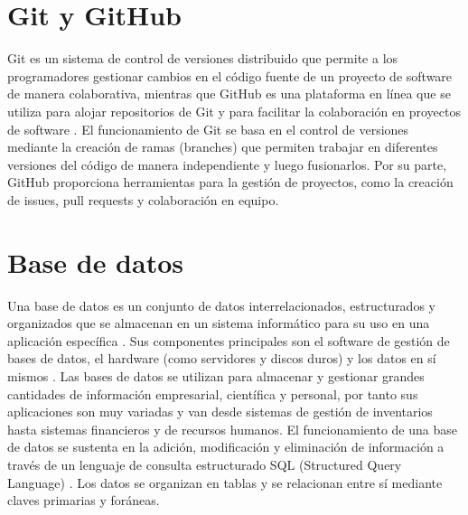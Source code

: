 \section{Git y GitHub}
Git es un sistema de control de versiones distribuido que permite a los programadores gestionar cambios en el código fuente de un proyecto de software de manera colaborativa, mientras que GitHub es una plataforma en línea que se utiliza para alojar repositorios de Git y para facilitar la colaboración en proyectos de software \cite{art:pro_git}.
El funcionamiento de Git se basa en el control de versiones mediante la creación de ramas (branches) que permiten trabajar en diferentes versiones del código de manera independiente y luego fusionarlos. Por su parte, GitHub proporciona herramientas para la gestión de proyectos, como la creación de issues, pull requests y colaboración en equipo.

\section{Base de datos}
Una base de datos es un conjunto de datos interrelacionados, estructurados y organizados que se almacenan en un sistema informático para su uso en una aplicación específica \cite{book:base_de_datos_connolly}. Sus componentes principales son el software de gestión de bases de datos, el hardware (como servidores y discos duros) y los datos en sí mismos \cite{book:base_de_datos_coronel}. 
Las bases de datos se utilizan para almacenar y gestionar grandes cantidades de información  empresarial, científica y personal, por tanto sus aplicaciones son muy variadas y van desde sistemas de gestión de inventarios hasta sistemas financieros y de recursos humanos. El funcionamiento de una base de datos se sustenta en la adición, modificación y eliminación de información a través de un lenguaje de consulta estructurado SQL (Structured Query Language) \cite{book:base_de_datos_ramakrishnan}. Los datos se organizan en tablas y se relacionan entre sí mediante claves primarias y foráneas. 

